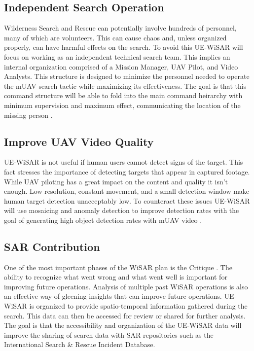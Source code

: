 \documentclass[12pt]{IEEEtran}
\begin{document}
\subsection{Independent Search Operation}
Wilderness Search and Rescue can potentially involve hundreds of personnel, many
of which are volunteers.  This can cause chaos and, unless organized properly,
can have harmful effects on the search.  To avoid this UE-WiSAR will focus on
working as an independent technical search team.  This implies an internal
organization comprised of a Mission Manager, UAV Pilot, and Video Analysts. 
This structure is designed to minimize the personnel needed to operate the mUAV
search tactic while maximizing its effectiveness.  The goal is that this command
structure will be able to fold into the main command heirarchy with minimum
supervision and maximum effect, communicating the location of the missing
person \cite{goodrich2008supporting}.

\subsection{Improve UAV Video Quality}
UE-WiSAR is not useful if human users cannot detect signs of the target.  This
fact stresses the importance of detecting targets that appear in captured
footage. While UAV piloting has a great impact on the content and quality it
isn't enough.  Low resolution, constant movement, and a small detection window
make human target detection unacceptably low.  To counteract these issues
UE-WiSAR will use mosaicing and anomaly detection to improve detection
rates with the goal of generating high object detection rates with mUAV video
\cite{thornton2011detection, morse2008application}.

\subsection{SAR Contribution}
One of the most important phases of the WiSAR plan is the
Critique \cite{setnicka1980}.  The ability to recognize what went wrong and what
went well is important for improving future operations.  Analysis of multiple
past WiSAR operations is also an effective way of gleening insights that can
improve future operations.  UE-WiSAR is organized to provide spatio-temporal
information gathered during the search.  This data can then be accessed for
review or shared for further analysis.  The goal is that the accessibility and
organization of the UE-WiSAR data will improve the sharing of search data with
SAR repositories such as the International Search \& Rescue Incident Database.
\end{document}
